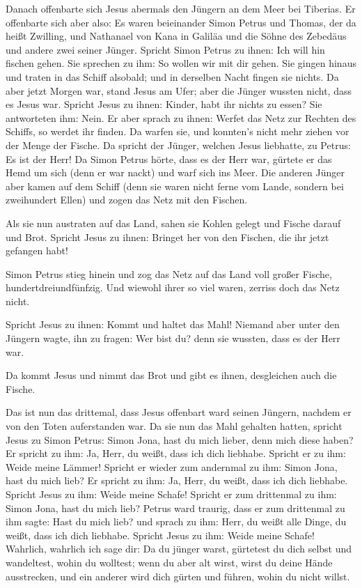  Danach offenbarte sich Jesus abermals den Jüngern an dem
Meer bei Tiberias. Er offenbarte sich aber also:  Es waren
beieinander Simon Petrus und Thomas, der da heißt Zwilling, und
Nathanael von Kana in Galiläa und die Söhne des Zebedäus und andere zwei
seiner Jünger.  Spricht Simon Petrus zu ihnen: Ich will
hin fischen gehen. Sie sprechen zu ihm: So wollen wir mit dir gehen. Sie
gingen hinaus und traten in das Schiff alsobald; und in derselben Nacht
fingen sie nichts.  Da aber jetzt Morgen war, stand Jesus
am Ufer; aber die Jünger wussten nicht, dass es Jesus war.
 Spricht Jesus zu ihnen: Kinder, habt ihr nichts zu essen?
Sie antworteten ihm: Nein.  Er aber sprach zu ihnen:
Werfet das Netz zur Rechten des Schiffs, so werdet ihr finden. Da warfen
sie, und konnten's nicht mehr ziehen vor der Menge der Fische.
 Da spricht der Jünger, welchen Jesus liebhatte, zu
Petrus: Es ist der Herr! Da Simon Petrus hörte, dass es der Herr war,
gürtete er das Hemd um sich (denn er war nackt) und warf sich ins Meer.
 Die anderen Jünger aber kamen auf dem Schiff (denn sie
waren nicht ferne vom Lande, sondern bei zweihundert Ellen) und zogen
das Netz mit den Fischen.

 Als sie nun austraten auf das Land, sahen sie Kohlen
gelegt und Fische darauf und Brot.  Spricht Jesus zu
ihnen: Bringet her von den Fischen, die ihr jetzt gefangen habt!

 Simon Petrus stieg hinein und zog das Netz auf das Land
voll großer Fische, hundertdreiundfünfzig. Und wiewohl ihrer so viel
waren, zerriss doch das Netz nicht.

 Spricht Jesus zu ihnen: Kommt und haltet das Mahl!
Niemand aber unter den Jüngern wagte, ihn zu fragen: Wer bist du? denn
sie wussten, dass es der Herr war.

 Da kommt Jesus und nimmt das Brot und gibt es ihnen,
desgleichen auch die Fische.

 Das ist nun das drittemal, dass Jesus offenbart ward
seinen Jüngern, nachdem er von den Toten auferstanden war.
 Da sie nun das Mahl gehalten hatten, spricht Jesus zu
Simon Petrus: Simon Jona, hast du mich lieber, denn mich diese haben? Er
spricht zu ihm: Ja, Herr, du weißt, dass ich dich liebhabe. Spricht er
zu ihm: Weide meine Lämmer!  Spricht er wieder zum
andernmal zu ihm: Simon Jona, hast du mich lieb? Er spricht zu ihm: Ja,
Herr, du weißt, dass ich dich liebhabe. Spricht Jesus zu ihm: Weide
meine Schafe!  Spricht er zum drittenmal zu ihm: Simon
Jona, hast du mich lieb? Petrus ward traurig, dass er zum drittenmal zu
ihm sagte: Hast du mich lieb? und sprach zu ihm: Herr, du weißt alle
Dinge, du weißt, dass ich dich liebhabe. Spricht Jesus zu ihm: Weide
meine Schafe!  Wahrlich, wahrlich ich sage dir: Da du
jünger warst, gürtetest du dich selbst und wandeltest, wohin du
wolltest; wenn du aber alt wirst, wirst du deine Hände ausstrecken, und
ein anderer wird dich gürten und führen, wohin du nicht willst.


